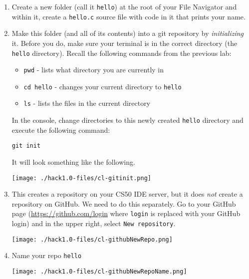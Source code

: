 \documentclass[12pt]{scrartcl}
\begin{document}
\begin{enumerate}
  \item Create a new folder (call it \texttt{hello}) 
  at the root of your File Navigator and within it, create a 
  \texttt{hello.c} source file with code in it that
  prints your name.
  
  \item Make this folder (and all of its contents) into a git
  repository by \emph{initializing} it.  Before you do, make sure
  your terminal is in the correct directory (the \texttt{hello}
  directory).  Recall the following commands from the previous lab:
  \begin{itemize}
    \item \texttt{pwd} - lists what directory you are currently in
    \item \texttt{cd hello} - changes your current directory to 
    \texttt{hello}
    \item \texttt{ls} - lists the files in the current directory
  \end{itemize}
  
  In the console, change directories to this newly created 
  \texttt{hello}
  directory and execute the following command:
  
  \texttt{git init}
  
  It will look something like the following.
  \begin{center}
  \texttt{[image: ./hack1.0-files/cl-gitinit.png]}
  \end{center}

  \item This creates a repository on your CS50 IDE server, but it
  does \emph{not} create a repository on GitHub.  We need to do 
  this separately.  Go to your GitHub page (\url{https://github.com/login}
  where \texttt{login} is replaced with your GitHub
  login) and in the upper right, select \texttt{New repository}.

  \begin{center}
  \texttt{[image: ./hack1.0-files/cl-githubNewRepo.png]}
  \end{center}

  \item Name your repo \texttt{hello}
  \begin{center}
  \texttt{[image: ./hack1.0-files/cl-githubNewRepoName.png]}
  \end{center}


\end{enumerate}
\end{document}
